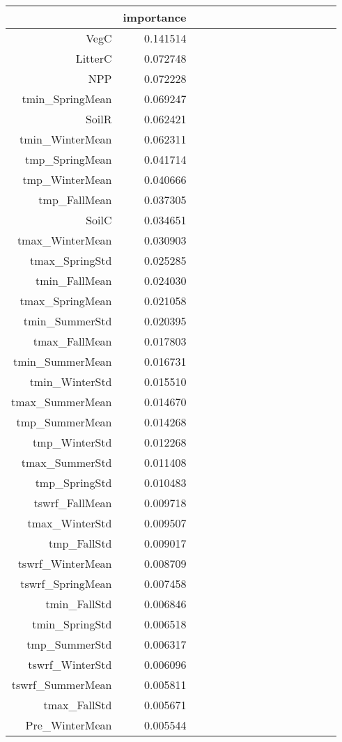 \begin{table}[h]
\centering
\label{table:5}
\begin{tabular}{rrrrrrrrrrrrrrr}
\toprule
 & importance \\
\midrule
VegC & 0.141514 \\
LitterC & 0.072748 \\
NPP & 0.072228 \\
tmin_SpringMean & 0.069247 \\
SoilR & 0.062421 \\
tmin_WinterMean & 0.062311 \\
tmp_SpringMean & 0.041714 \\
tmp_WinterMean & 0.040666 \\
tmp_FallMean & 0.037305 \\
SoilC & 0.034651 \\
tmax_WinterMean & 0.030903 \\
tmax_SpringStd & 0.025285 \\
tmin_FallMean & 0.024030 \\
tmax_SpringMean & 0.021058 \\
tmin_SummerStd & 0.020395 \\
tmax_FallMean & 0.017803 \\
tmin_SummerMean & 0.016731 \\
tmin_WinterStd & 0.015510 \\
tmax_SummerMean & 0.014670 \\
tmp_SummerMean & 0.014268 \\
tmp_WinterStd & 0.012268 \\
tmax_SummerStd & 0.011408 \\
tmp_SpringStd & 0.010483 \\
tswrf_FallMean & 0.009718 \\
tmax_WinterStd & 0.009507 \\
tmp_FallStd & 0.009017 \\
tswrf_WinterMean & 0.008709 \\
tswrf_SpringMean & 0.007458 \\
tmin_FallStd & 0.006846 \\
tmin_SpringStd & 0.006518 \\
tmp_SummerStd & 0.006317 \\
tswrf_WinterStd & 0.006096 \\
tswrf_SummerMean & 0.005811 \\
tmax_FallStd & 0.005671 \\
Pre_WinterMean & 0.005544 \\

\end{tabular}
\end{table}
